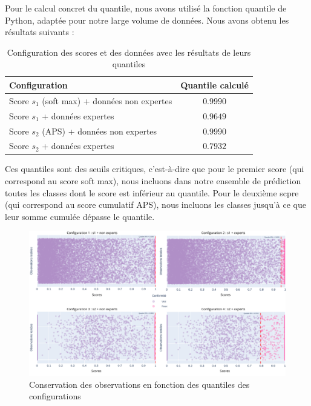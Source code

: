 \documentclass[a4paper,12pt]{article}
\begin{document}
\vspace{0.2cm}

Pour le calcul concret du quantile, nous avons utilisé la fonction quantile de Python, adaptée pour notre large volume de données. Nous avons obtenu les résultats suivants : 

\begin{table}[H]
\centering
    \begin{tabular}{|l|c|}
        \hline
        \textbf{Configuration} & \textbf{Quantile calculé} \\
        \hline
        Score $s_1$ (soft max) + données non expertes & $0.9990$ \\
        Score $s_1$ + données expertes & $0.9649$ \\
        Score $s_2$ (APS) + données non expertes & $0.9990$ \\
        Score $s_2$ + données expertes & $0.7932$ \\
        \hline
        \end{tabular}
    \caption{Configuration des scores et des données avec les résultats de leurs quantiles}
    \label{tab: scores et quantiles}
\end{table}

\vspace{0.2cm}

Ces quantiles sont des seuils critiques, c'est-à-dire que pour le premier score (qui correspond au score soft max), nous incluons dans notre ensemble de prédiction toutes les classes dont le score est inférieur au quantile. Pour le deuxième scpre (qui correspond au score cumulatif APS), nous incluons les classes jusqu'à ce que leur somme cumulée dépasse le quantile.

\begin{figure}[H]
    \centering
        \includegraphics[width=1\linewidth]{images/quantiles.png}
    \caption{Conservation des observations en fonction des quantiles des configurations}
    \label{fig:quantiles}
\end{figure}
\end{document}
